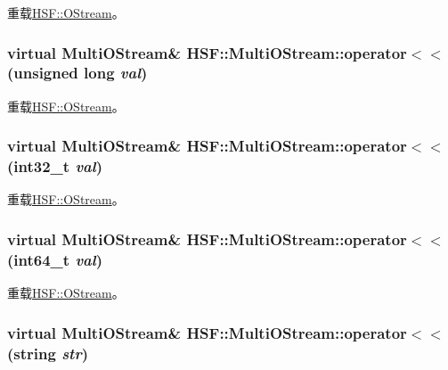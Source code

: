 重载\hyperlink{classHSF_1_1OStream_aa0cd93dd86633a0603d09d35e20c9520}{HSF::OStream}。\hypertarget{classHSF_1_1MultiOStream_a40a0605bc99045578fccf9c5413411f5}{
\subsubsection[{operator$<$$<$}]{\setlength{\rightskip}{0pt plus 5cm}virtual {\bf MultiOStream}\& HSF::MultiOStream::operator$<$$<$ (unsigned long {\em val})}}
\label{classHSF_1_1MultiOStream_a40a0605bc99045578fccf9c5413411f5}


重载\hyperlink{classHSF_1_1OStream_ae4edb4f375ace6dab22021629c29a24f}{HSF::OStream}。\hypertarget{classHSF_1_1MultiOStream_a83208fee91d9117cf7411cd63477c9fe}{
\subsubsection[{operator$<$$<$}]{\setlength{\rightskip}{0pt plus 5cm}virtual {\bf MultiOStream}\& HSF::MultiOStream::operator$<$$<$ (int32\_\-t {\em val})}}
\label{classHSF_1_1MultiOStream_a83208fee91d9117cf7411cd63477c9fe}


重载\hyperlink{classHSF_1_1OStream_a1bbf47f6f3c68938fb4c1006b878aa60}{HSF::OStream}。\hypertarget{classHSF_1_1MultiOStream_a960936ac105e7f2ed4801f0725dedfba}{
\subsubsection[{operator$<$$<$}]{\setlength{\rightskip}{0pt plus 5cm}virtual {\bf MultiOStream}\& HSF::MultiOStream::operator$<$$<$ (int64\_\-t {\em val})}}
\label{classHSF_1_1MultiOStream_a960936ac105e7f2ed4801f0725dedfba}


重载\hyperlink{classHSF_1_1OStream_a771b87dab59786db30cf1d5eb5473e64}{HSF::OStream}。\hypertarget{classHSF_1_1MultiOStream_ab928595ef99d77f13d961541cb2e9f78}{
\subsubsection[{operator$<$$<$}]{\setlength{\rightskip}{0pt plus 5cm}virtual {\bf MultiOStream}\& HSF::MultiOStream::operator$<$$<$ (string {\em str})}}
\label{classHSF_1_1MultiOStream_ab928595ef99d77f13d961541cb2e9f78}


